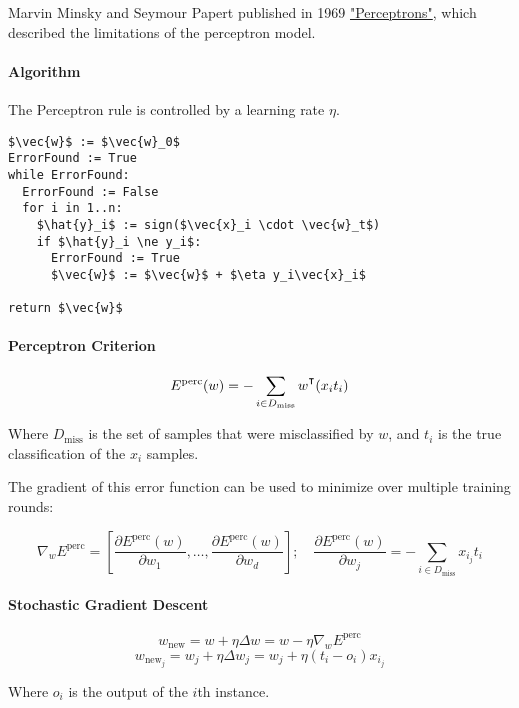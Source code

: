 \documentclass{idc_msc}
\renewcommand{\T}{{\mathpalette\raiseT\intercal}} %
\begin{document}
Marvin Minsky and Seymour Papert published in 1969 \href{https://mitpress.mit.edu/books/perceptrons}{"Perceptrons"}, which described the limitations of the perceptron model.

\paragraph{Algorithm}

The Perceptron rule is controlled by a learning rate \(\eta\).

\begin{lstlisting}[frame=L,mathescape=true,title={Perceptron Rule}]
$\vec{w}$ := $\vec{w}_0$
ErrorFound := True
while ErrorFound:
  ErrorFound := False
  for i in 1..n:
    $\hat{y}_i$ := sign($\vec{x}_i \cdot \vec{w}_t$)
    if $\hat{y}_i \ne y_i$:
      ErrorFound := True
      $\vec{w}$ := $\vec{w}$ + $\eta y_i\vec{x}_i$

return $\vec{w}$
\end{lstlisting}

\paragraph{Perceptron Criterion}

\[E^{\text{perc}}(w) = - \sum_{i \in D_{\text{miss}}} w^\T (x_i t_i)\]

Where \(D_{\text{miss}}\) is the set of samples that were misclassified by \(w\), and \(t_i\) is the true classification of the \(x_i\) samples.

The gradient of this error function can be used to minimize over multiple training rounds:

\[\nabla_w E^{\text{perc}} = \left[\frac{\partial E^{\text{perc}}(w)}{\partial w_1}, \ldots,\frac{\partial E^{\text{perc}}(w)}{\partial w_d} \right];\quad \frac{\partial E^{\text{perc}}(w)}{\partial w_j}=- \sum_{i \in D_{\text{miss}}}x_{i_j} t_i\]

\paragraph{Stochastic Gradient Descent}

\[w_{\text{new}} = w + \eta \Delta w = w - \eta \nabla_w E^{\text{perc}}\]
\[w_{\text{new}_j} = w_j + \eta \Delta w_j = w_j + \eta(t_i - o_i)x_{i_j}\]

Where \(o_i\) is the output of the \(i\)th instance.
\end{document}
